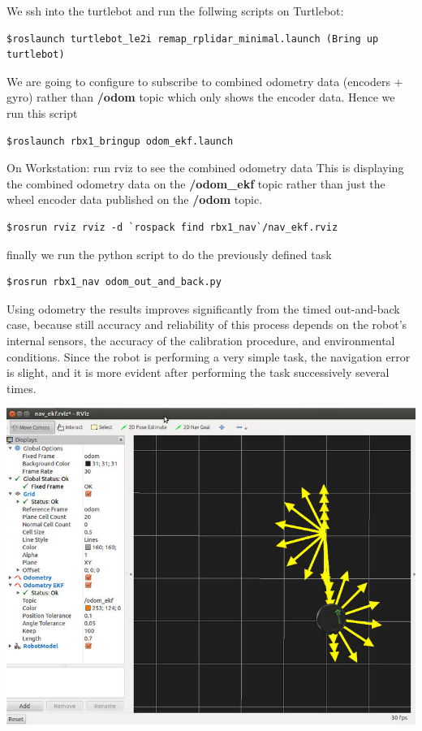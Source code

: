 \documentclass[10pt,a4paper]{article}
\begin{document}
We ssh into the turtlebot and run the follwing scripts
on Turtlebot:
\begin{lstlisting}[frame=single] 
$roslaunch turtlebot_le2i remap_rplidar_minimal.launch (Bring up turtlebot)
\end{lstlisting}
We are going to configure to subscribe to combined odometry data (encoders + gyro) 
rather than \textbf{/odom }topic which only shows the encoder data. Hence we run this script
\begin{lstlisting}[frame=single] 
$roslaunch rbx1_bringup odom_ekf.launch
\end{lstlisting}

On Workstation:
run rviz to see the combined odometry data
This is displaying the combined odometry data on the \textbf{/odom\_ekf} 
topic rather than just the wheel encoder data published on the \textbf{/odom} topic.
\begin{lstlisting}[frame=single] 
$rosrun rviz rviz -d `rospack find rbx1_nav`/nav_ekf.rviz
\end{lstlisting}

finally we run the python script to do the previously defined task 
\begin{lstlisting}[frame=single] 
$rosrun rbx1_nav odom_out_and_back.py
\end{lstlisting}

Using odometry the results improves significantly from the timed out-and-back case, because still accuracy and reliability of this process depends on the robot's internal sensors, the accuracy of the calibration procedure, and environmental conditions.
Since the robot is performing a very simple task, the navigation error is slight, and it is more evident after performing the task successively several times.

\begin{center}
\includegraphics[width=\textwidth]{images/odom_out_and_back.jpg}\\
\end{center}
\end{document}
